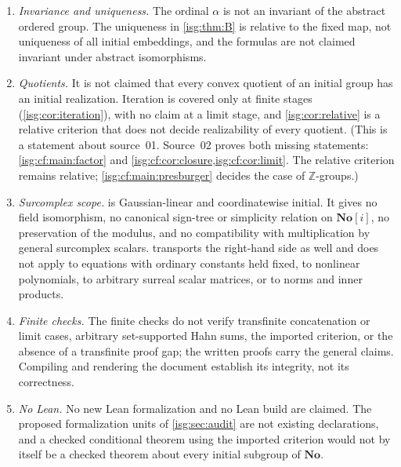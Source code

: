 \documentclass[11pt]{article}
\theoremstyle{definition}
\theoremstyle{remark}
\newcommand{\No}{\ensuremath{\mathbf{No}}}
\newcommand{\Z}{\mathbb{Z}}
\begin{document}
\begin{enumerate}[label=\textup{(N\arabic*)},leftmargin=*]
      ambient Hahn spaces; they give no internal summation on a subgroup
      $A$ (\cref{isg:rem:nocompletion}), and \cref{isg:lem:isolate} does
      not license arbitrary infinite subseries.
\item \emph{Invariance and uniqueness.} The ordinal $\alpha$ is not an
      invariant of the abstract ordered group. The uniqueness in
      \cref{isg:thm:B} is relative to the fixed map, not uniqueness of all
      initial embeddings, and the formulas are not claimed invariant under
      abstract isomorphisms.
\item \emph{Quotients.} It is not claimed that every convex quotient of
      an initial group has an initial realization. Iteration is covered
      only at finite stages (\cref{isg:cor:iteration}), with no claim at a
      limit stage, and \cref{isg:cor:relative} is a relative criterion
      that does not decide realizability of every quotient. (This is a
      statement about source~01. Source~02 proves both missing
      statements: \cref{isg:cf:main:factor} and
      \cref{isg:cf:cor:closure,isg:cf:cor:limit}. The relative criterion
      remains relative; \cref{isg:cf:main:presburger} decides the case of
      $\Z$-groups.)
\item \emph{Surcomplex scope.}  is Gaussian-linear
      and coordinatewise initial. It gives no field isomorphism, no
      canonical sign-tree or simplicity relation on $\No[i]$, no
      preservation of the modulus, and no compatibility with
      multiplication by general surcomplex scalars. 
      transports the right-hand side as well and does not apply to
      equations with ordinary constants held fixed, to nonlinear
      polynomials, to arbitrary surreal scalar matrices, or to norms and
      inner products.
\item \emph{Finite checks.} The finite checks do not verify transfinite
      concatenation or limit cases, arbitrary set-supported Hahn sums, the
      imported criterion, or the absence of a transfinite proof gap; the
      written proofs carry the general claims. Compiling and rendering the
      document establish its integrity, not its correctness.
\item \emph{No Lean.} No new Lean formalization and no Lean build are
      claimed. The proposed formalization units of \cref{isg:sec:audit} are
      not existing declarations, and a checked conditional theorem using
      the imported criterion would not by itself be a checked theorem
      about every initial subgroup of $\No$.

\end{enumerate}
\end{document}

